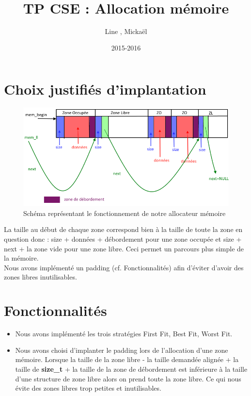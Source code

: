 \documentclass[10pt,a4paper]{article}
\title{TP CSE : Allocation mémoire}
\author{Line \bsc{POUVARET}, Mickaël \bsc{TURNEL}}
\date{2015-2016}
\begin{document}
\maketitle

\section{Choix justifiés d'implantation}
\begin{figure}[!ht]
	\center
	\includegraphics[width=15cm]{memoire.png}
 	\caption{Schéma représentant le fonctionnement de notre allocateur mémoire}
\end{figure}

La taille au début de chaque zone correspond bien à la taille de toute la zone en question donc : size + données + débordement pour une zone occupée et size + next + la zone vide pour une zone libre. Ceci permet un parcours plus simple de la mémoire.\\
Nous avons implémenté un padding (cf. Fonctionnalités) afin d'éviter d'avoir des zones libres inutilisables.
\section{Fonctionnalités}
\begin{itemize}
	\item Nous avons implémenté les trois stratégies First Fit, Best Fit, Worst Fit.
	\item Nous avons choisi d'implanter le padding lors de l'allocation d'une zone mémoire. Lorsque la taille de la zone libre - la taille demandée alignée + la taille de \textbf{size\_t} + la taille de la zone de débordement est inférieure à la taille d'une structure de zone libre alors on prend toute la zone libre. Ce qui nous évite des zones libres trop petites et inutilisables.
\end{itemize}
\end{document}

